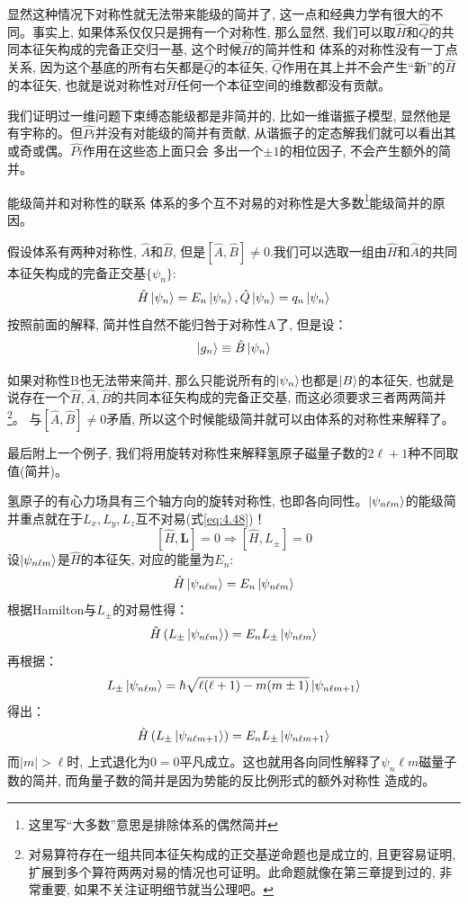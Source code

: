 显然这种情况下对称性就无法带来能级的简并了, 这一点和经典力学有很大的不同。事实上, 如果体系仅仅只是拥有一个对称性, 那么显然, 我们可以取$\hat{H}$和$\hat{Q}$的共同本征矢构成的完备正交归一基, 这个时候$\hat{H}$的简并性和
体系的对称性没有一丁点关系, 因为这个基底的所有右矢都是$\hat{Q}$的本征矢, $\hat{Q}$作用在其上并不会产生“新”的$\hat{H}$的本征矢, 也就是说对称性对$\hat{H}$任何一个本征空间的维数都没有贡献。

我们证明过一维问题下束缚态能级都是非简并的, 比如一维谐振子模型, 显然他是有宇称的。但$\hat{Pi}$并没有对能级的简并有贡献, 从谐振子的定态解我们就可以看出其或奇或偶。$\hat{Pi}$作用在这些态上面只会
多出一个$\pm 1 $的相位因子, 不会产生额外的简并。

\begin{proposition}{能级简并和对称性的联系}
    体系的多个互不对易的对称性是大多数\footnote{这里写“大多数”意思是排除体系的偶然简并}能级简并的原因。
\end{proposition}

假设体系有两种对称性, $\hat{A}$和$\hat{B}$, 但是$\left[\hat{A},\hat{B}\right]\neq 0$.我们可以选取一组由$\hat{H}$和$\hat{A}$的共同本征矢构成的完备正交基$\{\psi_n\}$:
\begin{equation}
    \hat{H}\ket{\psi_n}=E_n\ket{\psi_n},\hat{Q}\ket{\psi_n}=q_n\ket{\psi_n}
\end{equation}
按照前面的解释, 简并性自然不能归咎于对称性A了, 但是设：
\[\ket{g_n}\equiv\hat{B}\ket{\psi_n}\]

如果对称性B也无法带来简并, 那么只能说所有的$\ket{\psi_n}$也都是$\ket{B}$的本征矢, 也就是说存在一个$\hat{H},\hat{A},\hat{B}$的共同本征矢构成的完备正交基, 而这必须要求三者两两简并\footnote{对易算符存在一组共同本征矢构成的正交基逆命题也是成立的, 且更容易证明, 扩展到多个算符两两对易的情况也可证明。此命题就像在第三章提到过的, 非常重要, 如果不关注证明细节就当公理吧。}。
与$\left[\hat{A},\hat{B}\right]\neq 0$矛盾, 所以这个时候能级简并就可以由体系的对称性来解释了。

最后附上一个例子, 我们将用旋转对称性来解释氢原子磁量子数的$2\ell+1$种不同取值(简并)。

\begin{thinknote}
    氢原子的有心力场具有三个轴方向的旋转对称性, 也即各向同性。$\ket{\psi_{n\ell m}}$的能级简并重点就在于$L_x,L_y,L_z$互不对易(式\ref{eq:4.48})！
    \[\left[\hat{H},\mathbf{L}\right]=0\Rightarrow\left[\hat{H},L_\pm\right]=0\]
    设$\ket{\psi_{n\ell m}}$是$\hat{H}$的本征矢, 对应的能量为$E_n$:
    \[\hat{H}\ket{\psi_{n\ell m}}=E_n\ket{\psi_{n\ell m}}\]
    根据Hamilton与$L_\pm$的对易性得：
    \[\hat{H}\left(L_\pm\ket{\psi_{n\ell m}}\right)=E_n L_\pm\ket{\psi_{n\ell m}}\]
    再根据：
    \[L_\pm \ket{\psi_{n\ell m}}=\hbar\sqrt{\ell(\ell+1)-m(m\pm 1)}\ket{\psi_{n\ell m+1}}\]
    得出：
    \[\hat{H}\left(L_\pm\ket{\psi_{n\ell m+1}}\right)=E_n L_\pm\ket{\psi_{n\ell m+1}}\]
    而$|m|>\ell$时, 上式退化为$0=0$平凡成立。这也就用各向同性解释了$\psi_n\ell m$磁量子数的简并, 而角量子数的简并是因为势能的反比例形式的额外对称性
    造成的。
\end{thinknote}

